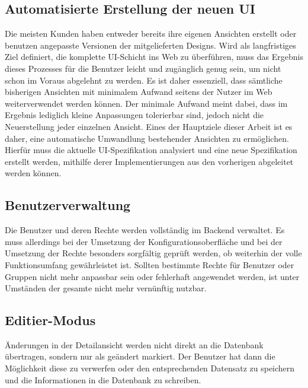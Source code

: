 \subsection{Automatisierte Erstellung der neuen UI}\label{subsec:func_req_automatic_ui_generation}
Die meisten Kunden haben entweder bereits ihre eigenen Ansichten erstellt oder benutzen angepasste Versionen der mitgelieferten Designs. Wird als langfristiges Ziel definiert, die komplette UI-Schicht ins Web zu überführen, muss das Ergebnis dieses Prozesses für die Benutzer leicht und zugänglich genug sein, um nicht schon im Voraus abgelehnt zu werden. Es ist daher essenziell, dass sämtliche bisherigen Ansichten mit minimalem Aufwand seitens der Nutzer im Web weiterverwendet werden können. Der minimale Aufwand meint dabei, dass im Ergebnis lediglich kleine Anpassungen tolerierbar sind, jedoch nicht die Neuerstellung jeder einzelnen Ansicht. Eines der Hauptziele dieser Arbeit ist es daher, eine automatische Umwandlung bestehender Ansichten zu ermöglichen. Hierfür muss die aktuelle UI-Spezifikation analysiert und eine neue Spezifikation erstellt werden, mithilfe derer Implementierungen aus den vorherigen abgeleitet werden können.

\subsection{Benutzerverwaltung}
Die Benutzer und deren Rechte werden vollständig im Backend verwaltet. Es muss allerdings bei der Umsetzung der Konfigurationsoberfläche und bei der Umsetzung der Rechte besonders sorgfältig geprüft werden, ob weiterhin der volle Funktionsumfang gewährleistet ist. Sollten bestimmte Rechte für Benutzer oder Gruppen nicht mehr anpassbar sein  oder fehlerhaft angewendet werden, ist unter Umständen der gesamte  nicht mehr vernünftig nutzbar.

\subsection{Editier-Modus}\label{subsec:func_req_edit_mode}
Änderungen in der Detailansicht werden nicht direkt an die Datenbank übertragen, sondern nur als geändert markiert. Der Benutzer hat dann die Möglichkeit diese zu verwerfen oder den entsprechenden Datensatz zu speichern und die Informationen in die Datenbank zu schreiben.

